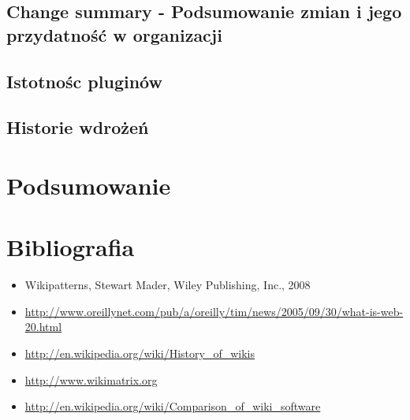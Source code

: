 \documentclass{article}
\begin{document}
	\subsection{Change summary - Podsumowanie zmian i  jego przydatność w organizacji}
	\subsection{Istotnośc pluginów}
	\subsection{Historie wdrożeń} %

\newpage
\section{Podsumowanie}

\newpage
\section{Bibliografia}
	\begin{itemize}
		\item 	Wikipatterns, Stewart Mader, Wiley Publishing, Inc., 2008
 		\item \url{http://www.oreillynet.com/pub/a/oreilly/tim/news/2005/09/30/what-is-web-20.html}
		\item \url{http://en.wikipedia.org/wiki/History_of_wikis}
		\item \url{http://www.wikimatrix.org}
		\item \url{http://en.wikipedia.org/wiki/Comparison_of_wiki_software}
	\end{itemize}
\end{document}
